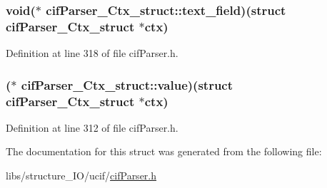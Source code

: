 \hypertarget{structcif_parser___ctx__struct_a1fd07a6c68e36136eb0c0e5ab2e02f74}{
\subsubsection[{text\-\_\-field}]{\setlength{\rightskip}{0pt plus 5cm}void($\ast$ cif\-Parser\-\_\-\-Ctx\-\_\-struct\-::text\-\_\-field)(struct {\bf cif\-Parser\-\_\-\-Ctx\-\_\-struct} $\ast$ctx)}}\label{structcif_parser___ctx__struct_a1fd07a6c68e36136eb0c0e5ab2e02f74}


Definition at line 318 of file cif\-Parser.\-h.

\hypertarget{structcif_parser___ctx__struct_ac0beb0988bb13922d4ebc6ebe34204e7}{
\subsubsection[{value}]{($\ast$ cif\-Parser\-\_\-\-Ctx\-\_\-struct\-::value)(struct {\bf cif\-Parser\-\_\-\-Ctx\-\_\-struct} $\ast$ctx)}}\label{structcif_parser___ctx__struct_ac0beb0988bb13922d4ebc6ebe34204e7}


Definition at line 312 of file cif\-Parser.\-h.



The documentation for this struct was generated from the following file\-:\begin{DoxyCompactItemize}
\item 
libs/structure\-\_\-\-I\-O/ucif/\hyperlink{cif_parser_8h}{cif\-Parser.\-h}\end{DoxyCompactItemize}
